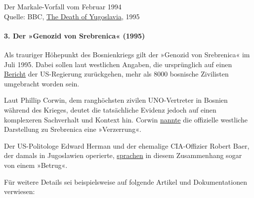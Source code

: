 Der Markale-Vorfall vom Februar 1994\\
Quelle: BBC,
\href{https://www.youtube.com/playlist?list=PLJvRFxihL4d03IzmoxyhU1C-kn27lxVvB}{The
Death of Yugoslavia}, 1995

\hypertarget{3-der-genozid-von-srebrenica-1995}{%
\paragraph{3. Der »Genozid von Srebrenica«
(1995)}\label{3-der-genozid-von-srebrenica-1995}}

Als trauriger Höhepunkt des Bosnienkriegs gilt der »Genozid von
Srebrenica« im Juli 1995. Dabei sollen laut westlichen Angaben, die
ursprünglich auf einen
\href{https://www.nytimes.com/1995/08/11/world/us-seeks-to-prove-mass-killings.html}{Bericht}
der US-Regierung zurück­gehen, mehr als 8000 bosnische Zivilisten
umgebracht worden sein.

Laut Phillip Corwin, dem ranghöchsten zivilen UNO-Vertreter in Bosnien
während des Krieges, deutet die tatsächliche Evidenz jedoch auf einen
komplexeren Sachverhalt und Kontext hin. Corwin
\href{https://swprs.files.wordpress.com/2019/12/the-srebrenica-massacre_edward-herman_2011.pdf\#page=7}{nannte}
die offizielle westliche Darstellung zu Srebrenica eine »Verzerrung«.

Der US-Politologe Edward Herman und der ehemalige CIA-Offizier Robert
Baer, der damals in Jugoslawien operierte,
\href{https://www.heise.de/tp/features/Nobelpreis-fuer-einen-Genozid-Leugner-4608176.html?seite=all}{sprachen}
in diesem Zusammenhang sogar von einem »Betrug«.

Für weitere Details sei beispielsweise auf folgende Artikel und
Dokumentationen verwiesen:

